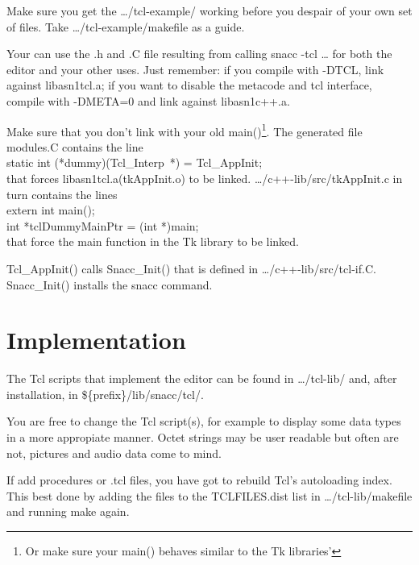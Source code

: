 Make sure you get the {\ufn \dots/tcl-example/} working before you despair of your own set of files.
Take {\ufn \dots/tcl-example/makefile} as a guide.

Your can use the {\ufn .h} and {\ufn .C} file resulting from calling {\ufn snacc -tcl \dots} for both the editor and your other uses.
Just remember: if you compile with {\ufn -DTCL}, link against {\ufn libasn1tcl.a}; if you want to disable the metacode and tcl interface, compile with {\ufn -DMETA=0} and link against {\ufn libasn1c++.a}.

Make sure that you don't link with your old {\C main()}\footnote{Or make sure your {\C main()} behaves similar to the Tk libraries'}.
The generated file {\ufn modules.C} contains the line\\
{\C static int (*dummy)(Tcl\_Interp~*) = Tcl\_AppInit;}\\
that forces {\ufn libasn1tcl.a(tkAppInit.o)} to be linked.
{\ufn \dots/c++-lib/src/tkAppInit.c} in turn contains the lines\\
{\C extern int main();\\
int *tclDummyMainPtr = (int *)main;}\\
that force the {\C main} function in the Tk library to be linked.

{\C Tcl\_AppInit()} calls {\C Snacc\_Init()} that is defined in {\ufn \dots/c++-lib/src/tcl-if.C}.
{\C Snacc\_Init()} installs the {\Tcl snacc} command.

\section{\label{snacced-impl}Implementation}

The Tcl scripts that implement the editor can be found in {\ufn \dots/tcl-lib/} and, after installation, in {\ufn \$\{prefix\}/lib/snacc/tcl/}.

You are free to change the Tcl script(s), for example to display some data types in a more appropiate manner.
Octet strings may be user readable but often are not, pictures and audio data come to mind.

If add procedures or {\ufn .tcl} files, you have got to rebuild Tcl's autoloading index.
This best done by adding the files to the {\Make TCLFILES.dist} list in {\ufn \dots/tcl-lib/makefile} and running {\ufn make} again.

